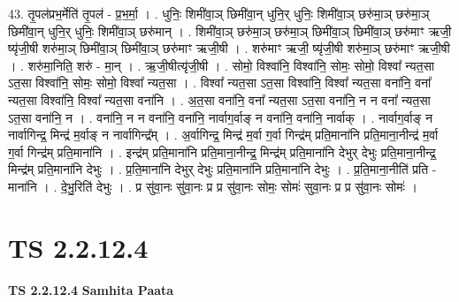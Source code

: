 \documentclass[17pt]{extarticle}
\begin{document}
43. तृ॒पल॑प्रभ॒र्मेति॑ तृ॒पल॑ - प्र॒भ॒र्मा॒ । . धुनिः॒ शिमी॑वा॒ञ् छिमी॑वा॒न् धुनि॒र् धुनिः॒ शिमी॑वा॒ञ् छरु॑मा॒ञ् छरु॑मा॒ञ् छिमी॑वा॒न् धुनि॒र् धुनिः॒ शिमी॑वा॒ञ् छरु॑मान् । . शिमी॑वा॒ञ् छरु॑मा॒ञ् छरु॑मा॒ञ् छिमी॑वा॒ञ् छिमी॑वा॒ञ् छरु॑माꣳ ऋजी॒ ष्यृ॑जी॒षी शरु॑मा॒ञ् छिमी॑वा॒ञ् छिमी॑वा॒ञ् छरु॑माꣳ ऋजी॒षी । . शरु॑माꣳ ऋजी॒ ष्यृ॑जी॒षी शरु॑मा॒ञ् छरु॑माꣳ ऋजी॒षी । . शरु॑मा॒निति॒ शरु॑ - मा॒न् । . ऋ॒जी॒षीत्यृ॑जी॒षी । . सोमो॒ विश्वा॑नि॒ विश्वा॑नि॒ सोमः॒ सोमो॒ विश्वा᳚ न्यत॒सा ऽत॒सा विश्वा॑नि॒ सोमः॒ सोमो॒ विश्वा᳚ न्यत॒सा । . विश्वा᳚ न्यत॒सा ऽत॒सा विश्वा॑नि॒ विश्वा᳚ न्यत॒सा वना॑नि॒ वना᳚ न्यत॒सा विश्वा॑नि॒ विश्वा᳚ न्यत॒सा वना॑नि । . अ॒त॒सा वना॑नि॒ वना᳚ न्यत॒सा ऽत॒सा वना॑नि॒ न न वना᳚ न्यत॒सा ऽत॒सा वना॑नि॒ न । . वना॑नि॒ न न वना॑नि॒ वना॑नि॒ नार्वाग॒र्वाङ् न वना॑नि॒ वना॑नि॒ नार्वाक् । . नार्वाग॒र्वाङ् न नार्वागिन्द्र॒ मिन्द्र॑ म॒र्वाङ् न नार्वागिन्द्र᳚म् । . अ॒र्वागिन्द्र॒ मिन्द्र॑ म॒र्वा ग॒र्वा गिन्द्र॑म् प्रति॒माना॑नि प्रति॒माना॒नीन्द्र॑ म॒र्वा ग॒र्वा गिन्द्र॑म् प्रति॒माना॑नि । . इन्द्र॑म् प्रति॒माना॑नि प्रति॒माना॒नीन्द्र॒ मिन्द्र॑म् प्रति॒माना॑नि देभुर् देभुः प्रति॒माना॒नीन्द्र॒ मिन्द्र॑म् प्रति॒माना॑नि देभुः । . प्र॒ति॒माना॑नि देभुर् देभुः प्रति॒माना॑नि प्रति॒माना॑नि देभुः । . प्र॒ति॒माना॒नीति॑ प्रति - माना॑नि । . दे॒भु॒रिति॑ देभुः । . प्र सु॑वा॒नः सु॑वा॒नः प्र प्र सु॑वा॒नः सोमः॒ सोमः॑ सुवा॒नः प्र प्र सु॑वा॒नः सोमः॑ । \newline
\pagebreak
{}

\section{ TS 2.2.12.4 }

\textbf{TS 2.2.12.4 } \newline
\textbf{Samhita Paata} \newline
\end{document}
